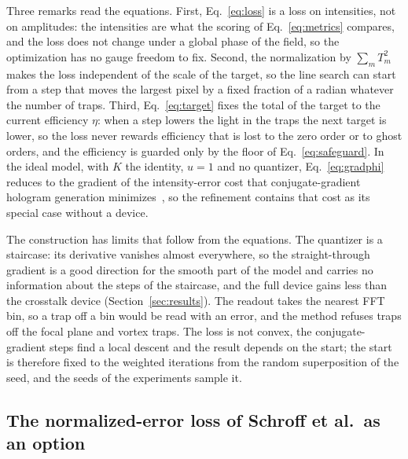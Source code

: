 Three remarks read the equations. First, Eq.~\ref{eq:loss} is a loss on intensities, not on amplitudes: the intensities are what the scoring of Eq.~\ref{eq:metrics} compares, and the loss does not change under a global phase of the field, so the optimization has no gauge freedom to fix. Second, the normalization by $\sum_mT_m^2$ makes the loss independent of the scale of the target, so the line search can start from a step that moves the largest pixel by a fixed fraction of a radian whatever the number of traps. Third, Eq.~\ref{eq:target} fixes the total of the target to the current efficiency $\eta$: when a step lowers the light in the traps the next target is lower, so the loss never rewards efficiency that is lost to the zero order or to ghost orders, and the efficiency is guarded only by the floor of Eq.~\ref{eq:safeguard}. In the ideal model, with $K$ the identity, $u=1$ and no quantizer, Eq.~\ref{eq:gradphi} reduces to the gradient of the intensity-error cost that conjugate-gradient hologram generation minimizes~\cite{harte}, so the refinement contains that cost as its special case without a device.

The construction has limits that follow from the equations. The quantizer is a staircase: its derivative vanishes almost everywhere, so the straight-through gradient is a good direction for the smooth part of the model and carries no information about the steps of the staircase, and the full device gains less than the crosstalk device (Section~\ref{sec:results}). The readout takes the nearest FFT bin, so a trap off a bin would be read with an error, and the method refuses traps off the focal plane and vortex traps. The loss is not convex, the conjugate-gradient steps find a local descent and the result depends on the start; the start is therefore fixed to the weighted iterations from the random superposition of the seed, and the seeds of the experiments sample it.

\subsection{The normalized-error loss of Schroff et al.\ as an option}\label{sec:nel}

